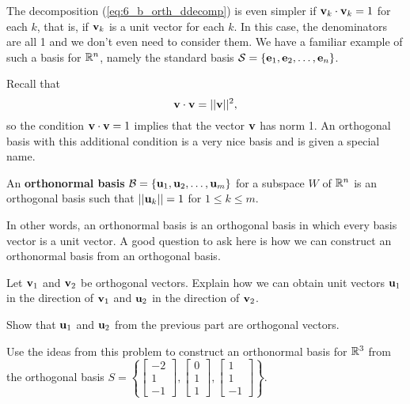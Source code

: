 \label{sec:orthon_bases}

The decomposition (\ref{eq:6_b_orth_ddecomp}) is even simpler if $\mathbf{v}_k \cdot \mathbf{v}_k = 1$ for each $k$, that is, if $\mathbf{v}_k$ is a unit vector for each $k$. In this case, the denominators are all 1 and we don't even need to consider them. We have a familiar example of such a basis for $\mathbb{R}^n$, namely the standard basis $\mathcal{S} = \{\mathbf{e}_1, \mathbf{e}_2, \ldots, \mathbf{e}_n\}$.

Recall that
\[\mathbf{v} \cdot \mathbf{v} = || \mathbf{v} ||^2,\]
so the condition $\mathbf{v} \cdot \mathbf{v} = 1$ implies that the vector $\mathbf{v}$ has norm 1. An orthogonal basis with this additional condition is a very nice basis and is given a special name.

\begin{definition} \label{def:6_b_orthonormal_basis} An \textbf{orthonormal basis} $\mathcal{B} = \{\mathbf{u}_1, \mathbf{u}_2, \ldots, \mathbf{u}_m\}$ for a subspace $W$ of $\mathbb{R}^n$ is an orthogonal basis such that $|| \mathbf{u}_k || = 1$ for $1\leq k\leq m$.
\end{definition}

In other words, an orthonormal basis is an orthogonal basis in which every basis vector is a unit vector. A good question to ask here is how we can construct an orthonormal basis from an orthogonal basis.



\begin{activity} \hfill
	\ba
	\item Let $\mathbf{v}_1$ and $\mathbf{v}_2$ be orthogonal vectors. Explain how we can obtain unit vectors $\mathbf{u}_1$ in the direction of $\mathbf{v}_1$ and $\mathbf{u}_2$ in the direction of $\mathbf{v}_2$.
	
	
	
	\item Show that $\mathbf{u}_1$ and $\mathbf{u}_2$ from the previous part are orthogonal vectors.
	
	
	
	\item Use the ideas from this problem to construct an orthonormal basis for $\mathbb{R}^3$ from the orthogonal basis $S = \left\{ \left[ \begin{array}{r} -2 \\ 1 \\ -1 \end{array} \right], \left[ \begin{array}{r} 0 \\ 1 \\ 1 \end{array} \right], \left[ \begin{array}{r} 1 \\ 1 \\ -1 \end{array} \right] \right\}$.
	
	
	
	\ea
\end{activity}

